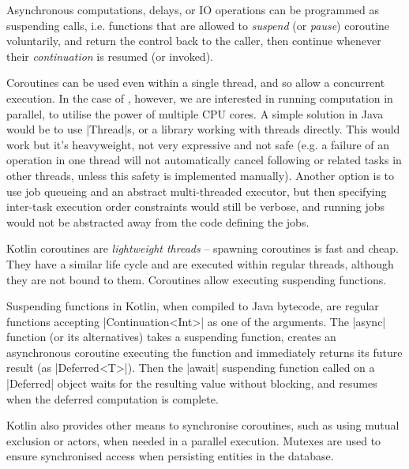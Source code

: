 Asynchronous computations, delays, or IO operations can be programmed as suspending calls, i.e. functions that are allowed to \textsl{suspend} (or \textsl{pause}) coroutine voluntarily, and return the control back to the caller, then continue whenever their \textsl{continuation} is resumed (or invoked).

Coroutines can be used even within a single thread, and so allow a concurrent execution.
In the case of \graffs, however, we are interested in running computation in parallel, to utilise the power of multiple CPU cores.
A simple solution in Java would be to use |Thread|s, or a library working with threads directly.
This would work but it's heavyweight, not very expressive and not safe (e.g. a failure of an operation in one thread will not automatically cancel following or related tasks in other threads, unless this safety is implemented manually).
Another option is to use job queueing and an abstract multi-threaded executor, but then specifying inter-task execution order constraints would still be verbose, and running jobs would not be abstracted away from the code defining the jobs.

Kotlin coroutines are \textsl{lightweight threads} -- spawning coroutines is fast and cheap\cite{AriasFunctionalKotlinExtend2018}.
They have a similar life cycle and are executed within regular threads, although they are not bound to them\cite{TorresLearningConcurrencyKotlin2018}.
Coroutines allow executing suspending functions.

Suspending functions in Kotlin, when compiled to Java bytecode, are regular functions accepting |Continuation<Int>| as one of the arguments.
The |async| function (or its alternatives) takes a suspending function, creates an asynchronous coroutine executing the function and immediately returns its future result (as |Deferred<T>|).
Then the |await| suspending function called on a |Deferred| object waits for the resulting value without blocking, and resumes when the deferred computation is complete.

Kotlin also provides other means to synchronise coroutines, such as using mutual exclusion or actors, when needed in a parallel execution.
Mutexes are used to ensure synchronised access when persisting entities in the database.


